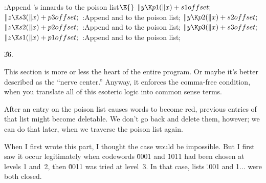 \B{}:Append 's innards to the poison list\X${}\E{}$\6
$\|y\K\\{p1}(\|x)+\\{s1offset};{}$\6
${}\|z\K\\{s3}(\|x)+\\{p3offset};{}$\6
:Append  and  to the poison list\X;\6
${}\|y\K\\{p2}(\|x)+\\{s2offset};{}$\6
${}\|z\K\\{s2}(\|x)+\\{p2offset};{}$\6
:Append  and  to the poison list\X;\6
${}\|y\K\\{p3}(\|x)+\\{s3offset};{}$\6
${}\|z\K\\{s1}(\|x)+\\{p1offset};{}$\6
:Append  and  to the poison list\X;\par
\U36.\fi

This section is more or less the heart of the entire program.
Or maybe it's better described as the ``nerve center.'' Anyway,
it enforces the comma-free condition, when you translate all of
this esoteric logic into common sense terms.

After an entry on the poison list causes words to become red, previous
entries of that list might become deletable. We don't go back and delete
them, however; we can do that later, when we traverse the poison list again.

When I first wrote this part, I thought the case 
would be
impossible. But I first saw it occur legitimately when codewords \.{0001}
and \.{1011} had been chosen at levels 1 and~2, then \.{0011} was tried
at level~3. In that case, lists \.{.001} and \.{1...} were both closed.

